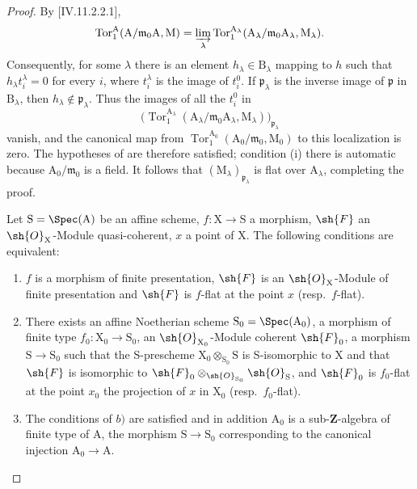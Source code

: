 \begin{proof}
By [IV.11.2.2.1],
\[
  \operatorname{Tor}_1^\mathrm A
  (\mathrm A/\mathfrak m_0\mathrm A,\mathrm M)
  =\varinjlim_\lambda
  \operatorname{Tor}_1^{\mathrm A_\lambda}
  (\mathrm A_\lambda/\mathfrak m_0\mathrm A_\lambda,
   \mathrm M_\lambda).
\]
Consequently, for some $\lambda$ there is an element
$h_\lambda\in\mathrm B_\lambda$ mapping to $h$ such that
$h_\lambda t_i^\lambda=0$ for every $i$, where $t_i^\lambda$ is the
image of $t_i^0$. If $\mathfrak p_\lambda$ is the inverse image of
$\mathfrak p$ in $\mathrm B_\lambda$, then
$h_\lambda\notin\mathfrak p_\lambda$. Thus the images of all the
$t_i^0$ in
\[
  \bigl(\operatorname{Tor}_1^{\mathrm A_\lambda}
  (\mathrm A_\lambda/\mathfrak m_0\mathrm A_\lambda,
   \mathrm M_\lambda)\bigr)_{\mathfrak p_\lambda}
\]
vanish, and the canonical map from
$\operatorname{Tor}_1^{\mathrm A_0}
(\mathrm A_0/\mathfrak m_0,\mathrm M_0)$ to this localization is zero.
The hypotheses of  are therefore satisfied; condition
(i) there is automatic because $\mathrm A_0/\mathfrak m_0$ is a field.
It follows that $(\mathrm M_\lambda)_{\mathfrak p_\lambda}$ is flat
over $\mathrm A_\lambda$, completing the proof.

\begin{corollary}[11.2.7]
\label{IV.11.2.7}
Let $\mathrm{S}=\Spec(\mathrm{A})$ be an affine scheme, $f:\mathrm{X}\to\mathrm{S}$ a morphism, $\sh{F}$ an $\sh{O}_\mathrm{X}$-Module quasi-coherent, $x$ a point of $\mathrm{X}$. The following conditions are equivalent:
\begin{enumerate}[label=\emph{\alph*)}]
  \item $f$ is a morphism of finite presentation, $\sh{F}$ is an $\sh{O}_\mathrm{X}$-Module of finite presentation and $\sh{F}$ is $f$-flat at the point $x$ (resp.\ $f$-flat).
  \item There exists an affine Noetherian scheme $\mathrm{S}_0=\Spec(\mathrm{A}_0)$, a morphism of finite type $f_0:\mathrm{X}_0\to\mathrm{S}_0$, an $\sh{O}_{\mathrm{X}_0}$-Module coherent $\sh{F}_0$, a morphism $\mathrm{S}\to\mathrm{S}_0$ such that the S-prescheme $\mathrm{X}_0\otimes_{\mathrm{S}_0}\mathrm{S}$ is S-isomorphic to $\mathrm{X}$ and that $\sh{F}$ is isomorphic to $\sh{F}_0\otimes_{\sh{O}_{\mathrm{S}_0}}\sh{O}_\mathrm{S}$, and $\sh{F}_0$ is $f_0$-flat at the point $x_0$ the projection of $x$ in $\mathrm{X}_0$ (resp.\ $f_0$-flat).
  \item The conditions of $b)$ are satisfied and in addition $\mathrm{A}_0$ is a sub-$\mathbf{Z}$-algebra of finite type of $\mathrm{A}$, the morphism $\mathrm{S}\to\mathrm{S}_0$ corresponding to the canonical injection $\mathrm{A}_0\to\mathrm{A}$.
\end{enumerate}
\end{corollary}


\end{proof}
